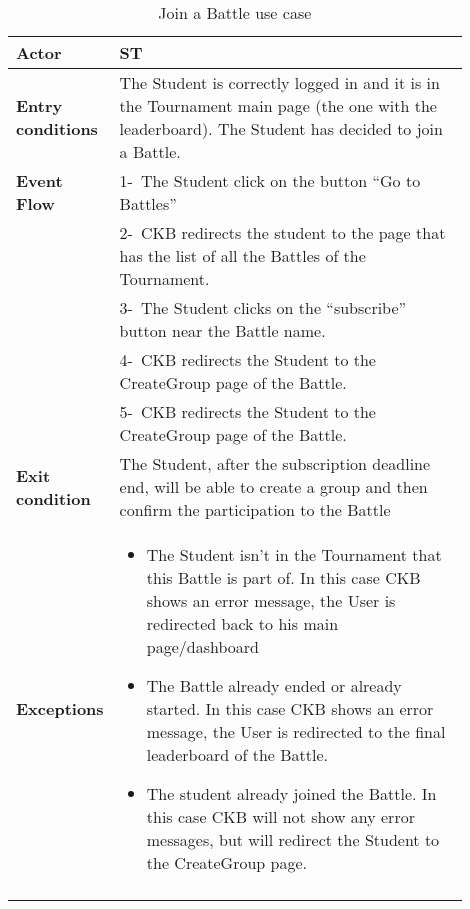\begin{center}
    \begin{longtable}{|l|p{0.9\linewidth}|}
        \hline
        \textbf{Actor}            & ST                                                                                                                                                                                        \\
        \hline
        \textbf{Entry conditions} & The Student is correctly logged in and it is in the Tournament main page (the one with the leaderboard). The Student has decided to join a Battle.        \\
        \hline
        \textbf{Event Flow}       & 1-\ The Student click on the button “Go to Battles”        \\
        & 2-\ CKB redirects the student to the page that has the list of all the Battles of the Tournament.        \\
        & 3-\ The Student clicks on the “subscribe” button near the Battle name.        \\
        & 4-\ CKB redirects the Student to the CreateGroup page of the Battle.        \\
        & 5-\ CKB redirects the Student to the CreateGroup page of the Battle.        \\
        \hline
        \textbf{Exit condition}   & The Student, after the subscription deadline end, will be able to create a group and then confirm the participation to the Battle        \\
        \hline
        \textbf{Exceptions}        & \begin{itemize}
            \item The Student isn’t in the Tournament that this Battle is part of. In this case CKB shows an error message, the User is redirected back to his main page/dashboard
            \item The Battle already ended or already started. In this case  CKB shows an error message, the User is redirected to the final leaderboard of the Battle.
            \item The student already joined the Battle. In this case CKB will not show any error messages, but will redirect the Student to the CreateGroup page.
         \end{itemize}    \\
        \hline
        \caption{Join a Battle use case}
        \label{tab: join_a_Battle_use_case}
    \end{longtable}
\end{center}

